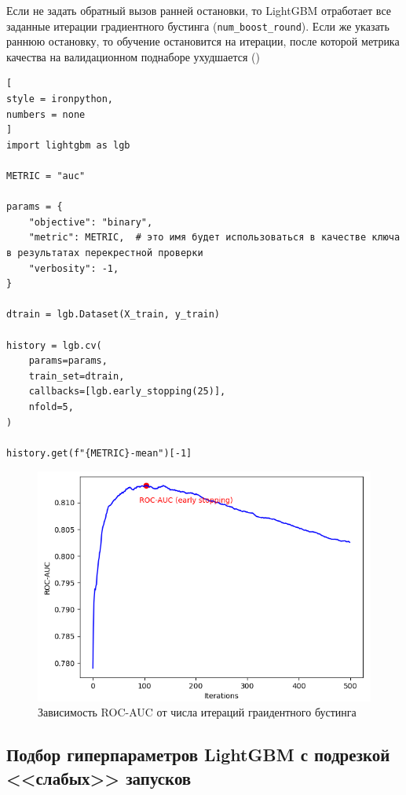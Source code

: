 \documentclass[%
	11pt,
	a4paper,
	utf8,
		]{article}
\begin{document}
Если не задать обратный вызов ранней остановки, то LightGBM отработает все заданные итерации градиентного бустинга (\verb|num_boost_round|). Если же указать раннюю остановку, то обучение остановится на итерации, после которой метрика качества на валидационном поднаборе ухудшается ()
\begin{lstlisting}[
style = ironpython,
numbers = none
]
import lightgbm as lgb

METRIC = "auc"

params = {
    "objective": "binary",
    "metric": METRIC,  # это имя будет использоваться в качестве ключа в результатах перекрестной проверки
    "verbosity": -1,
}

dtrain = lgb.Dataset(X_train, y_train)

history = lgb.cv(
    params=params,
    train_set=dtrain,
    callbacks=[lgb.early_stopping(25)],
    nfold=5,
)

history.get(f"{METRIC}-mean")[-1]
\end{lstlisting}

\begin{figure}[h]
	\centering
	\includegraphics[scale=0.85]{figures/lgb_early_stopping.png}
	\caption{ Зависимость ROC-AUC от числа итераций граидентного бустинга }\label{fig:lgb_early_stopping}
\end{figure}



\subsection{Подбор гиперпараметров LightGBM с подрезкой <<слабых>> запусков}
\end{document}
